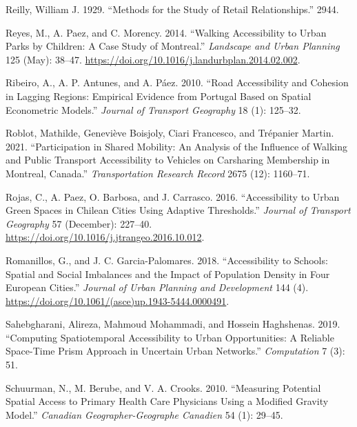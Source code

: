 \documentclass[
]{article}
\newlength{\cslhangindent}
\newenvironment{CSLReferences}[2] %
 {\begin{list}{}{%
  \setlength{\itemindent}{0pt}
  \setlength{\leftmargin}{0pt}
  \setlength{\parsep}{0pt}
  \ifodd #1
   \setlength{\leftmargin}{\cslhangindent}
   \setlength{\itemindent}{-1\cslhangindent}
  \fi
  \setlength{\itemsep}{#2\baselineskip}}}
 {\end{list}}
\begin{document}
\begin{CSLReferences}{1}{0}
Reilly, William J. 1929. {``Methods for the Study of Retail
Relationships.''} 2944.

Reyes, M., A. Paez, and C. Morency. 2014. {``Walking Accessibility to
Urban Parks by Children: {A} Case Study of {Montreal}.''}
\emph{Landscape and Urban Planning} 125 (May): 38--47.
\url{https://doi.org/10.1016/j.landurbplan.2014.02.002}.

Ribeiro, A., A. P. Antunes, and A. Páez. 2010. {``Road Accessibility and
Cohesion in Lagging Regions: {Empirical} Evidence from {Portugal} Based
on Spatial Econometric Models.''} \emph{Journal of Transport Geography}
18 (1): 125--32.

Roblot, Mathilde, Geneviève Boisjoly, Ciari Francesco, and Trépanier
Martin. 2021. {``Participation in Shared Mobility: An Analysis of the
Influence of Walking and Public Transport Accessibility to Vehicles on
Carsharing Membership in Montreal, Canada.''} \emph{Transportation
Research Record} 2675 (12): 1160--71.

Rojas, C., A. Paez, O. Barbosa, and J. Carrasco. 2016. {``Accessibility
to Urban Green Spaces in {Chilean} Cities Using Adaptive Thresholds.''}
\emph{Journal of Transport Geography} 57 (December): 227--40.
\url{https://doi.org/10.1016/j.jtrangeo.2016.10.012}.

Romanillos, G., and J. C. Garcia-Palomares. 2018. {``Accessibility to
{Schools}: {Spatial} and {Social} {Imbalances} and the {Impact} of
{Population} {Density} in {Four} {European} {Cities}.''} \emph{Journal
of Urban Planning and Development} 144 (4).
\url{https://doi.org/10.1061/(asce)up.1943-5444.0000491}.

Sahebgharani, Alireza, Mahmoud Mohammadi, and Hossein Haghshenas. 2019.
{``Computing Spatiotemporal Accessibility to Urban Opportunities: A
Reliable Space-Time Prism Approach in Uncertain Urban Networks.''}
\emph{Computation} 7 (3): 51.

Schuurman, N., M. Berube, and V. A. Crooks. 2010. {``Measuring Potential
Spatial Access to Primary Health Care Physicians Using a Modified
Gravity Model.''} \emph{Canadian Geographer-Geographe Canadien} 54 (1):
29--45.


\end{CSLReferences}
\end{document}
